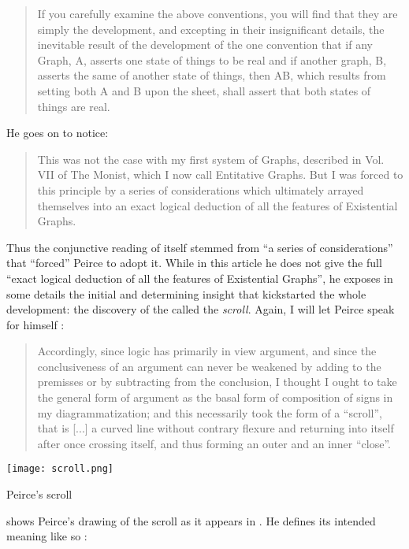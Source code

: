 \begin{scope}
\begin{quote}
If you carefully examine the above conventions, you will find that they are
simply the development, and excepting in their insignificant details, the
inevitable result of the development of the one convention that if any Graph, A,
asserts one state of things to be real and if another graph, B, asserts the same
of another state of things, then AB, which results from setting both A and B
upon the sheet, shall assert that both states of things are real.
\end{quote}

He goes on to notice:

\begin{quote}
   This was not the case with my first system of Graphs, described in Vol. VII
of The Monist, which I now call Entitative Graphs. But I was forced to this
principle by a series of considerations which ultimately arrayed themselves into
an exact logical deduction of all the features of Existential Graphs.
\end{quote}

Thus the conjunctive reading of  itself stemmed from ``a series of
considerations'' that ``forced'' Peirce to adopt it. While in this article he
does not give the full ``exact logical deduction of all the features of
Existential Graphs'', he exposes in some details the initial and determining
insight that kickstarted the whole development: the discovery of the  called
the \emph{scroll}. Again, I will let Peirce speak for
himself \cite[pp.~533--534]{peirce_prolegomena_1906}:

\begin{quote}
  Accordingly, since logic has primarily in view argument, and since the
conclusiveness of an argument can never be weakened by adding to the premisses
or by subtracting from the conclusion, I thought I ought to take the general
form of argument as the basal form of composition of signs in my
diagrammatization; and this necessarily took the form of a ``scroll'', that is
[...] a curved line without contrary flexure and returning into itself after
once crossing itself, and thus forming an outer and an inner ``close''.
\end{quote}

\begin{marginfigure}
  \texttt{[image: scroll.png]}
  \caption{Peirce's scroll}
\end{marginfigure}

 shows Peirce's drawing of the scroll as it appears in
\cite[Fig.~5]{peirce_prolegomena_1906}. He defines its intended meaning like so
\cite[p.~534--535]{peirce_prolegomena_1906}:


\end{scope}

